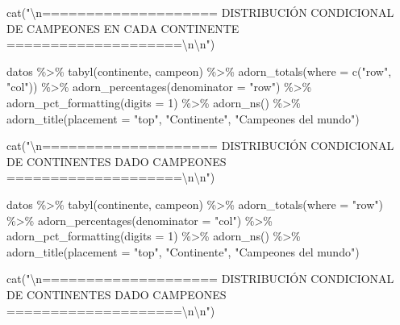 \documentclass[
]{book}
\newenvironment{Shaded}{\begin{snugshade}}{\end{snugshade}}
\newcommand{\AttributeTok}[1]{\textcolor[rgb]{0.77,0.63,0.00}{#1}}
\newcommand{\DecValTok}[1]{\textcolor[rgb]{0.00,0.00,0.81}{#1}}
\newcommand{\FunctionTok}[1]{\textcolor[rgb]{0.00,0.00,0.00}{#1}}
\newcommand{\NormalTok}[1]{#1}
\newcommand{\SpecialCharTok}[1]{\textcolor[rgb]{0.00,0.00,0.00}{#1}}
\newcommand{\StringTok}[1]{\textcolor[rgb]{0.31,0.60,0.02}{#1}}
\begin{document}
\begin{Shaded}
\begin{Highlighting}[]
\FunctionTok{cat}\NormalTok{(}\StringTok{"}\SpecialCharTok{\textbackslash{}n}\StringTok{==================== DISTRIBUCIÓN CONDICIONAL DE CAMPEONES EN CADA CONTINENTE ====================}\SpecialCharTok{\textbackslash{}n\textbackslash{}n}\StringTok{"}\NormalTok{)}

\NormalTok{datos }\SpecialCharTok{\%\textgreater{}\%} 
    \FunctionTok{tabyl}\NormalTok{(continente, campeon) }\SpecialCharTok{\%\textgreater{}\%} 
    \FunctionTok{adorn\_totals}\NormalTok{(}\AttributeTok{where =} \FunctionTok{c}\NormalTok{(}\StringTok{"row"}\NormalTok{, }\StringTok{"col"}\NormalTok{)) }\SpecialCharTok{\%\textgreater{}\%} 
    \FunctionTok{adorn\_percentages}\NormalTok{(}\AttributeTok{denominator =} \StringTok{"row"}\NormalTok{) }\SpecialCharTok{\%\textgreater{}\%}
    \FunctionTok{adorn\_pct\_formatting}\NormalTok{(}\AttributeTok{digits =} \DecValTok{1}\NormalTok{) }\SpecialCharTok{\%\textgreater{}\%} 
    \FunctionTok{adorn\_ns}\NormalTok{() }\SpecialCharTok{\%\textgreater{}\%} 
    \FunctionTok{adorn\_title}\NormalTok{(}\AttributeTok{placement =} \StringTok{"top"}\NormalTok{, }\StringTok{"Continente"}\NormalTok{, }\StringTok{"Campeones del mundo"}\NormalTok{)}

\FunctionTok{cat}\NormalTok{(}\StringTok{"}\SpecialCharTok{\textbackslash{}n}\StringTok{==================== DISTRIBUCIÓN CONDICIONAL DE CONTINENTES DADO CAMPEONES ====================}\SpecialCharTok{\textbackslash{}n\textbackslash{}n}\StringTok{"}\NormalTok{)}

\NormalTok{datos }\SpecialCharTok{\%\textgreater{}\%} 
    \FunctionTok{tabyl}\NormalTok{(continente, campeon) }\SpecialCharTok{\%\textgreater{}\%} 
    \FunctionTok{adorn\_totals}\NormalTok{(}\AttributeTok{where =} \StringTok{"row"}\NormalTok{) }\SpecialCharTok{\%\textgreater{}\%} 
    \FunctionTok{adorn\_percentages}\NormalTok{(}\AttributeTok{denominator =} \StringTok{"col"}\NormalTok{) }\SpecialCharTok{\%\textgreater{}\%}
    \FunctionTok{adorn\_pct\_formatting}\NormalTok{(}\AttributeTok{digits =} \DecValTok{1}\NormalTok{) }\SpecialCharTok{\%\textgreater{}\%} 
    \FunctionTok{adorn\_ns}\NormalTok{() }\SpecialCharTok{\%\textgreater{}\%} 
    \FunctionTok{adorn\_title}\NormalTok{(}\AttributeTok{placement =} \StringTok{"top"}\NormalTok{, }\StringTok{"Continente"}\NormalTok{, }\StringTok{"Campeones del mundo"}\NormalTok{)}

\FunctionTok{cat}\NormalTok{(}\StringTok{"}\SpecialCharTok{\textbackslash{}n}\StringTok{==================== DISTRIBUCIÓN CONDICIONAL DE CONTINENTES DADO CAMPEONES ====================}\SpecialCharTok{\textbackslash{}n\textbackslash{}n}\StringTok{"}\NormalTok{)}


\end{Highlighting}
\end{Shaded}
\end{document}
